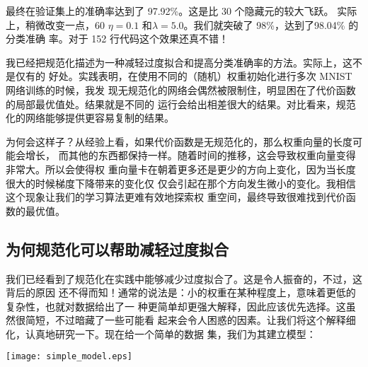最终在验证集上的准确率达到了 97.92\%。这是比 30 个隐藏元的较大飞跃。
\label{chap3_98_04_percent}实际上，稍微改变一点，60 \epochs{}
$\eta=0.1$ 和$\lambda = 5.0$。我们就突破了 98\%，达到了98.04\% 的分类准确
率\label{98percent}。对于 152 行代码这个效果还真不错！

我已经把规范化描述为一种减轻过度拟合和提高分类准确率的方法。实际上，这不是仅有的
好处。实践表明，在使用不同的（随机）权重初始化进行多次 MNIST 网络训练的时候，我发
现无规范化的网络会偶然被限制住，明显困在了代价函数的局部最优值处。结果就是不同的
运行会给出相差很大的结果。对比看来，规范化的网络能够提供更容易复制的结果。

为何会这样子？从经验上看，如果代价函数是无规范化的，那么权重向量的长度可能会增长，
而其他的东西都保持一样。随着时间的推移，这会导致权重向量变得非常大。所以会使得权
重向量卡在朝着更多还是更少的方向上变化，因为当长度很大的时候梯度下降带来的变化仅
仅会引起在那个方向发生微小的变化。我相信这个现象让我们的学习算法更难有效地探索权
重空间，最终导致很难找到代价函数的最优值。

\subsection{为何规范化可以帮助减轻过度拟合}

%
%
% 

我们已经看到了规范化在实践中能够减少过度拟合了。这是令人振奋的，不过，这背后的原因
还不得而知！通常的说法是：小的权重在某种程度上，意味着更低的复杂性，也就对数据给出了一
种更简单却更强大解释，因此应该优先选择。这虽然很简短，不过暗藏了一些可能看
起来会令人困惑的因素。让我们将这个解释细化，认真地研究一下。现在给一个简单的数据
集，我们为其建立模型：
\begin{center}
  \texttt{[image: simple\_model.eps]}
\end{center}
	
